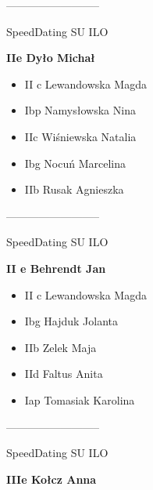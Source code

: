 \documentclass[a4paper,10pt]{article}
\begin{document}
\begin{multicols}{3}
\begin{minipage}[l]{\textwidth}
\begin{itemize}
    \end{itemize}



\end{minipage}



\begin{minipage}[l]{\textwidth}
--------------------------

  \footnotesize{SpeedDating SU ILO}

  \bfseries{IIe Dyło Michał}

  \begin{itemize}
    \item II c Lewandowska Magda
    \item Ibp Namysłowska Nina
    \item IIc Wiśniewska Natalia
    \item Ibg Nocuń Marcelina
    \item IIb Rusak Agnieszka

    \end{itemize}



\end{minipage}



\begin{minipage}[l]{\textwidth}
--------------------------

  \footnotesize{SpeedDating SU ILO}

  \bfseries{II e Behrendt Jan}

  \begin{itemize}
    \item II c Lewandowska Magda
    \item Ibg Hajduk Jolanta
    \item IIb Zelek Maja
    \item IId Faltus Anita
    \item Iap Tomasiak Karolina

    \end{itemize}



\end{minipage}



\begin{minipage}[l]{\textwidth}
--------------------------

  \footnotesize{SpeedDating SU ILO}

  \bfseries{IIIe Kołcz Anna}


\end{minipage}
\end{multicols}
\end{document}
